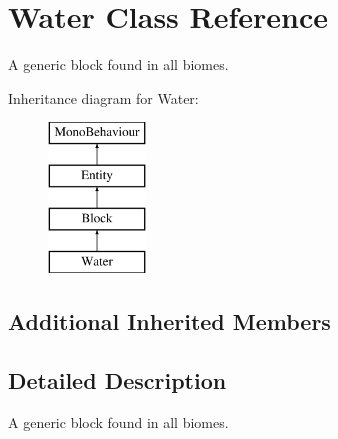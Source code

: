 \hypertarget{class_water}{}\section{Water Class Reference}
\label{class_water}


A generic block found in all biomes.  


Inheritance diagram for Water\+:\begin{figure}[H]
\begin{center}
\leavevmode
\includegraphics[height=4.000000cm]{class_water}
\end{center}
\end{figure}
\subsection*{Additional Inherited Members}


\subsection{Detailed Description}
A generic block found in all biomes. 

